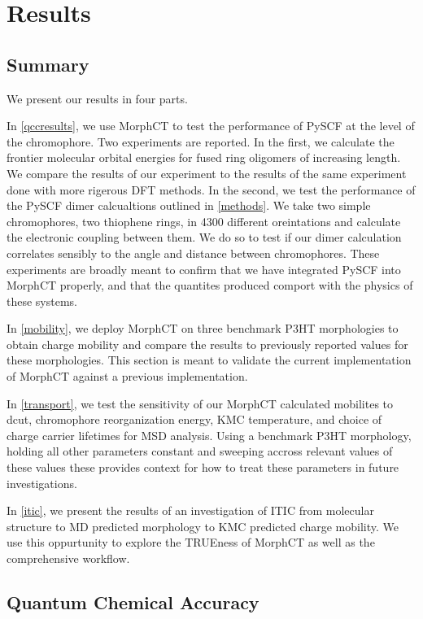 \chapter{Results}
\label{results}

\section{Summary}

We present our results in four parts. 

In \autoref{qccresults}, we use MorphCT to test the performance of PySCF at the level of the chromophore.
Two experiments are reported. In the first, we calculate the frontier molecular orbital
energies for fused ring oligomers of increasing length. We compare the results of our experiment to the
results of the same experiment done with more rigerous DFT methods. In the second, we test the 
performance of the PySCF dimer calcualtions outlined in \autoref{methods}. 
We take two simple chromophores, two thiophene rings, in 4300 different oreintations and calculate the
electronic coupling between them. We do so to test if our dimer calculation correlates sensibly to the angle
and distance between chromophores. These experiments are broadly meant to confirm that we have integrated
PySCF into MorphCT properly, and that the quantites produced comport with the physics of these systems.  

In \autoref{mobility}, we deploy MorphCT on three benchmark P3HT morphologies to obtain charge mobility
and compare the results to previously reported values for these morphologies. This section is meant to
validate the current implementation of MorphCT against a previous implementation. 

In \autoref{transport}, we test the sensitivity of our MorphCT calculated mobilites to dcut, chromophore
reorganization energy, KMC temperature, and choice of charge carrier lifetimes for MSD analysis. Using a
benchmark P3HT morphology, holding all other parameters constant and sweeping accross relevant values of these
values these provides context for how to treat these parameters in future investigations. 

In \autoref{itic}, we present the results of an investigation of ITIC from molecular structure to MD predicted
morphology to KMC predicted charge mobility. We use this oppurtunity to explore the TRUEness of MorphCT as
well as the comprehensive workflow.  

\section{Quantum Chemical Accuracy}

